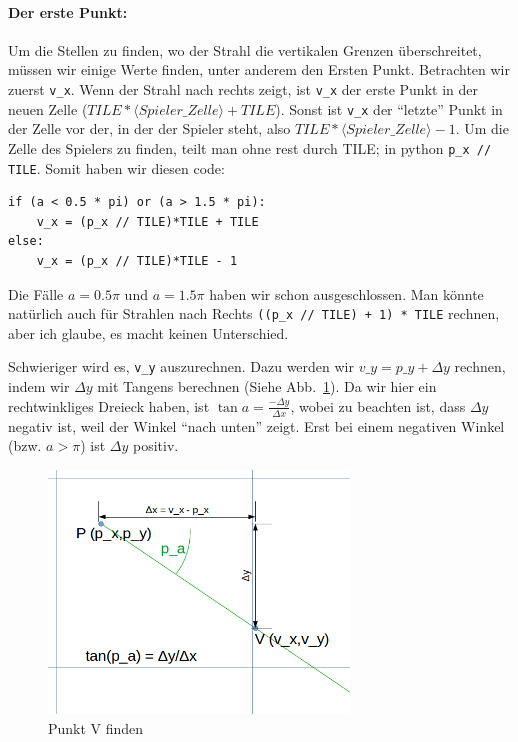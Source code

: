 \documentclass[a4paper,12pt]{report}
\begin{document}
\paragraph{Der erste Punkt:}
Um die Stellen zu finden, wo der Strahl die vertikalen Grenzen \"uberschreitet, m\"ussen wir einige Werte finden, unter anderem den Ersten Punkt. Betrachten wir zuerst \texttt{v\_x}. Wenn der Strahl nach rechts zeigt, ist \texttt{v\_x} der erste Punkt in der neuen Zelle ($TILE*\langle Spieler\_Zelle\rangle + TILE$). Sonst ist \texttt{v\_x} der ``letzte'' Punkt in der Zelle vor der, in der der Spieler steht, also $TILE*\langle Spieler\_Zelle\rangle - 1$. Um die Zelle des Spielers zu finden, teilt man ohne rest durch TILE; in python \texttt{p\_x // TILE}. Somit haben wir diesen code:
\begin{Verbatim}[baselinestretch=1.0, xleftmargin=1cm]
if (a < 0.5 * pi) or (a > 1.5 * pi):
	v_x = (p_x // TILE)*TILE + TILE
else:
	v_x = (p_x // TILE)*TILE - 1
\end{Verbatim}

Die F\"alle $a = 0.5\pi$ und $a = 1.5\pi$ haben wir schon ausgeschlossen. Man k\"onnte nat\"urlich auch f\"ur Strahlen nach Rechts \texttt{((p\_x // TILE) + 1) * TILE} rechnen, aber ich glaube, es macht keinen Unterschied.

Schwieriger wird es, \texttt{v\_y} auszurechnen. Dazu werden wir $v\_y = p\_y + \Delta y$ rechnen, indem wir $\Delta y$ mit Tangens berechnen (Siehe Abb.~\ref{fig:vcheck1}). Da wir hier ein rechtwinkliges Dreieck haben, ist $\tan a = \frac{-\Delta y}{\Delta x}$, wobei zu beachten ist, dass $\Delta y$ negativ ist, weil der Winkel ``nach unten'' zeigt.
Erst bei einem negativen Winkel (bzw. $a > \pi$) ist $\Delta y$ positiv.

\begin{figure}[htbp] 
        \centering
        \includegraphics[width=8cm]{vcheck1.png} 
        \caption{Punkt V finden}
        \label{fig:vcheck1}
\end{figure}
\end{document}
